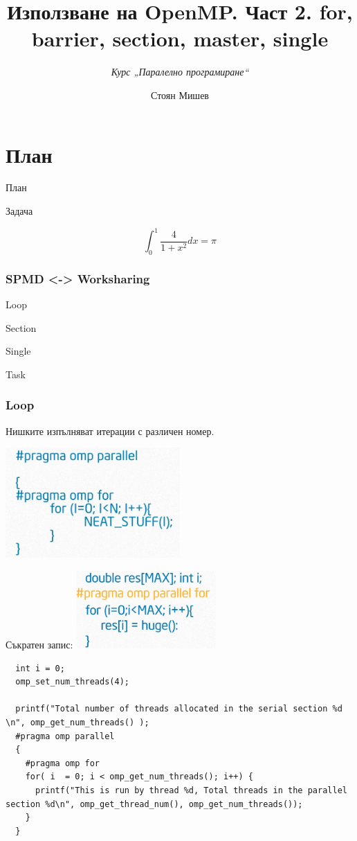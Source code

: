 \documentclass{beamer}
\title{Използване на OpenMP. Част 2. for, barrier, section, master, single }
\subtitle{\textit{Курс „Паралелно програмиране“}}
\author{\newline \newline Стоян Мишев}
\date{} %
\begin{document}
\lstset{language=Python}
{ 
\frame{\titlepage}}


\section*{План}\begin{frame}{План}\tableofcontents\end{frame}


\begin{frame}[plain]{Задача}

  \begin{equation}
    \int_0^1 \frac{4}{1+x^2} dx = \pi  \nonumber
  \end{equation}
\end{frame}

\begin{frame}
  \frametitle{SPMD <-> Worksharing}
  Loop

  Section

  Single

  Task
\end{frame}


\begin{frame}
  \frametitle{Loop}
  Нишките изпълняват итерации с различен номер.

  \centering
  \includegraphics[width=0.5\textwidth]{for}  \pause

  Съкратен запис:
  \includegraphics[width=0.4\textwidth]{for-short}
\end{frame}

\begin{frame}
\scriptsize
\lstset{language=C++}
\begin{lstlisting}
  int i = 0;
  omp_set_num_threads(4);

  printf("Total number of threads allocated in the serial section %d \n", omp_get_num_threads() );
  #pragma omp parallel 
  {
    #pragma omp for
    for( i  = 0; i < omp_get_num_threads(); i++) {
      printf("This is run by thread %d, Total threads in the parallel section %d\n", omp_get_thread_num(), omp_get_num_threads());
    }
  }
\end{lstlisting}
\end{frame}
\end{document}
